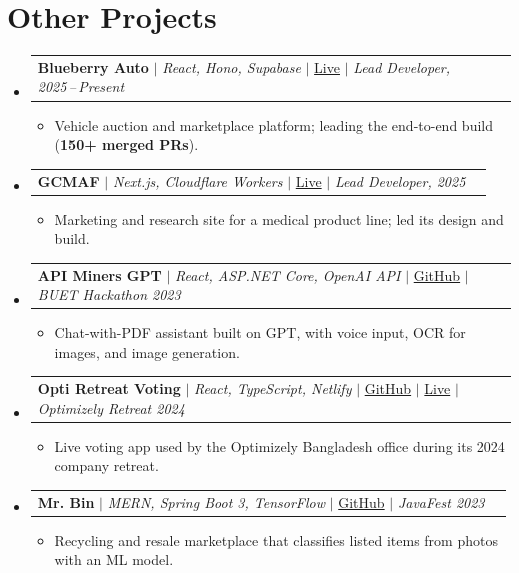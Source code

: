 \documentclass[letterpaper,11pt]{article}
\makeatletter
\newcommand{\resumeItem}[1]{
  \item\small{{#1 \vspace{-2pt}}}
}
\newcommand{\resumeProjectHeading}[2]{
    \vspace{-2pt}\item
    \begin{tabular*}{0.97\textwidth}{l@{\extracolsep{\fill}}r}
      \small#1 & #2 \\
    \end{tabular*}\vspace{-7pt}
}
\newcommand{\resumeSubHeadingListStart}{\begin{itemize}[leftmargin=0.15in, label={}]}
\newcommand{\resumeSubHeadingListEnd}{\end{itemize}}
\newcommand{\resumeItemListStart}{\begin{itemize}}
\newcommand{\resumeItemListEnd}{\end{itemize}\vspace{-5pt}}
\makeatother
\begin{document}

\section{Other Projects}
    \vspace{3pt}
    \resumeSubHeadingListStart

      \resumeProjectHeading
        {\textbf{Blueberry Auto} $|$ \emph{React, Hono, Supabase} $|$ \href{https://blueberry.com.bd/}{\color{blue}Live} $|$ \textit{Lead Developer, 2025\,--\,Present}}{}
          \resumeItemListStart
            \resumeItem{Vehicle auction and marketplace platform; leading the end-to-end build (\textbf{150+ merged PRs}).}
          \resumeItemListEnd

      \resumeProjectHeading
        {\textbf{GCMAF} $|$ \emph{Next.js, Cloudflare Workers} $|$ \href{https://gcmaf.net}{\color{blue}Live} $|$ \textit{Lead Developer, 2025}}{}
          \resumeItemListStart
            \resumeItem{Marketing and research site for a medical product line; led its design and build.}
          \resumeItemListEnd

      \resumeProjectHeading
        {\textbf{API Miners GPT} $|$ \emph{React, ASP.NET Core, OpenAI API} $|$ \href{https://github.com/jaf107/API-Miners-GPT}{\color{blue}GitHub} $|$ \textit{BUET Hackathon 2023}}{}
          \resumeItemListStart
            \resumeItem{Chat-with-PDF assistant built on GPT, with voice input, OCR for images, and image generation.}
          \resumeItemListEnd

      \resumeProjectHeading
        {\textbf{Opti Retreat Voting} $|$ \emph{React, TypeScript, Netlify} $|$ \href{https://github.com/jaf107/opti-retreat-voting-system}{\color{blue}GitHub} $|$ \href{https://optiretreat2024.netlify.app}{\color{blue}Live} $|$ \textit{Optimizely Retreat 2024}}{}
          \resumeItemListStart
            \resumeItem{Live voting app used by the Optimizely Bangladesh office during its 2024 company retreat.}
          \resumeItemListEnd

      \resumeProjectHeading
        {\textbf{Mr. Bin} $|$ \emph{MERN, Spring Boot 3, TensorFlow} $|$ \href{https://github.com/jaf107/Mr.Bin-Javafest}{\color{blue}GitHub} $|$ \textit{JavaFest 2023}}{}
          \resumeItemListStart
            \resumeItem{Recycling and resale marketplace that classifies listed items from photos with an ML model.}
          \resumeItemListEnd

    \resumeSubHeadingListEnd
\end{document}
